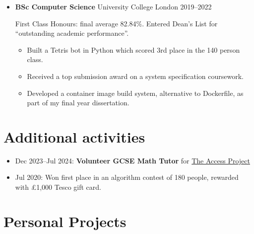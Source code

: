   \begin{itemize}
    \item \textbf{BSc Computer Science} \dashdiv{} University College London \dashdiv{} 2019--2022

      First Class Honours: final average 82.84\%. Entered Dean's List for ``outstanding academic performance''.

      \begin{itemize}
        \item Built a Tetris bot in Python which scored 3rd place in the 140 person class.
        \item Received a top submission award on a system specification coursework.

        \item Developed a container image build system, alternative to Dockerfile, as part of my final year dissertation.
      \end{itemize}


  \end{itemize}

  \section{Additional activities}

  \begin{itemize}
    \item Dec 2023--Jul 2024: \textbf{Volunteer GCSE Math Tutor} for \href{https://www.theaccessproject.org.uk}{\color{link}The Access Project}
    \item Jul 2020: Won first place in an algorithm contest of 180 people, rewarded with £1,000 Tesco gift card.
  \end{itemize}

  \section{Personal Projects}

